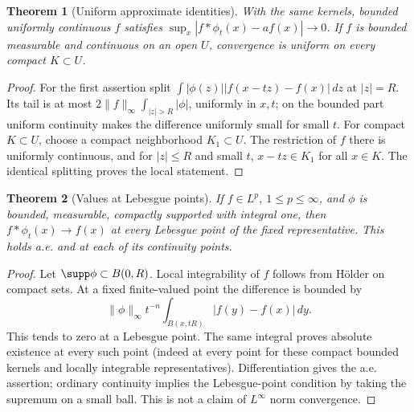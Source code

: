 \documentclass[11pt,oneside,openany]{book}
\newtheorem{theorem}{Theorem}[chapter]
\theoremstyle{definition}
\theoremstyle{remark}
\newcommand{\family}[1]{}
\begin{document}
\begin{theorem}[Uniform approximate identities]\family{D11.11.approximate_identity_uniform}\label{d11:11:approximate-identity-uniform}
With the same kernels, bounded uniformly continuous $f$ satisfies
$\sup_x|f*\phi_t(x)-af(x)|\to0$. If $f$ is bounded measurable and
continuous on an open $U$, convergence is uniform on every compact
$K\subset U$.
\end{theorem}
\begin{proof}
For the first assertion split
$\int|\phi(z)||f(x-tz)-f(x)|\,dz$ at $|z|=R$. Its tail is at most
$2\|f\|_\infty\int_{|z|>R}|\phi|$, uniformly in $x,t$; on the bounded
part uniform continuity makes the difference uniformly small for small $t$.
For compact $K\subset U$, choose a compact neighborhood $K_1\subset U$.
The restriction of $f$ there is uniformly continuous, and for $|z|\leq R$
and small $t$, $x-tz\in K_1$ for all $x\in K$. The identical splitting
proves the local statement.
\end{proof}

\begin{theorem}[Values at Lebesgue points]\family{D11.11.approximate_identity_lebesgue_points}\label{d11:11:approximate-identity-lebesgue-points}
If $f\in L^p$, $1\leq p\leq\infty$, and $\phi$ is bounded, measurable,
compactly supported with integral one, then $f*\phi_t(x)\to f(x)$ at
every Lebesgue point of the fixed representative. This holds a.e. and
at each of its continuity points.
\end{theorem}
\begin{proof}
Let $\supp\phi\subset B(0,R)$. Local integrability of $f$ follows from
H\"older on compact sets. At a fixed finite-valued point the difference is
bounded by
\[
 \|\phi\|_\infty t^{-n}
 \int_{B(x,tR)}|f(y)-f(x)|\,dy.
\]
This tends to zero at a Lebesgue point. The same integral proves absolute
existence at every such point (indeed at every point for these compact
bounded kernels and locally integrable representatives). Differentiation
gives the a.e. assertion; ordinary continuity implies the Lebesgue-point
condition by taking the supremum on a small ball. This is not a claim of
$L^\infty$ norm convergence.
\end{proof}
\end{document}
